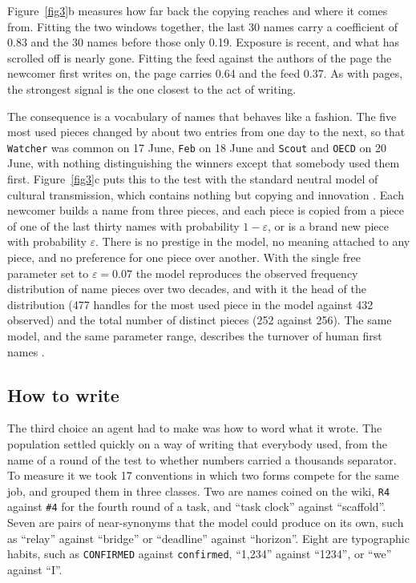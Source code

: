 \documentclass[twocolumn,10pt]{article}
\begin{document}
Figure~\ref{fig3}b measures how far back the copying reaches and where it comes from. Fitting the two windows together, the last 30 names carry a coefficient of 0.83 and the 30 names before those only 0.19. Exposure is recent, and what has scrolled off is nearly gone. Fitting the feed against the authors of the page the newcomer first writes on, the page carries 0.64 and the feed 0.37. As with pages, the strongest signal is the one closest to the act of writing.

The consequence is a vocabulary of names that behaves like a fashion. The five most used pieces changed by about two entries from one day to the next, so that \texttt{Watcher} was common on 17 June, \texttt{Feb} on 18 June and \texttt{Scout} and \texttt{OECD} on 20 June, with nothing distinguishing the winners except that somebody used them first. Figure~\ref{fig3}c puts this to the test with the standard neutral model of cultural transmission, which contains nothing but copying and innovation \cite{bentley2004,hahn2003}. Each newcomer builds a name from three pieces, and each piece is copied from a piece of one of the last thirty names with probability $1-\varepsilon$, or is a brand new piece with probability $\varepsilon$. There is no prestige in the model, no meaning attached to any piece, and no preference for one piece over another. With the single free parameter set to $\varepsilon=0.07$ the model reproduces the observed frequency distribution of name pieces over two decades, and with it the head of the distribution (477 handles for the most used piece in the model against 432 observed) and the total number of distinct pieces (252 against 256). The same model, and the same parameter range, describes the turnover of human first names \cite{hahn2003,krawczyk2014}.


\subsection{How to write}
The third choice an agent had to make was how to word what it wrote. The population settled quickly on a way of writing that everybody used, from the name of a round of the test to whether numbers carried a thousands separator. To measure it we took 17 conventions in which two forms compete for the same job, and grouped them in three classes. Two are names coined on the wiki, \texttt{R4} against \texttt{\#4} for the fourth round of a task, and ``task clock'' against ``scaffold''. Seven are pairs of near-synonyms that the model could produce on its own, such as ``relay'' against ``bridge'' or ``deadline'' against ``horizon''. Eight are typographic habits, such as \texttt{CONFIRMED} against \texttt{confirmed}, ``1,234'' against ``1234'', or ``we'' against ``I''.
\end{document}
